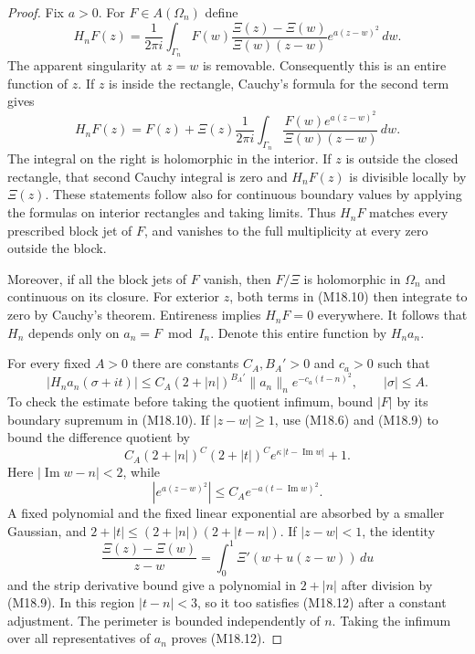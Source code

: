 \documentclass[11pt,a4paper]{article}
\begin{document}
\begin{proof}
Fix \(a>0\).  For \(F\in A(\Omega_n)\) define
\[
 H_nF(z)=\frac1{2\pi i}\int_{\Gamma_n}
    F(w)\frac{\Xi(z)-\Xi(w)}{\Xi(w)(z-w)}
                      e^{a(z-w)^2}\,dw .                       \tag{M18.10}
\]
The apparent singularity at \(z=w\) is removable.
Consequently this is an entire function of \(z\).
If \(z\) is inside the rectangle, Cauchy's formula
for the second term gives
\[
 H_nF(z)=F(z)+\Xi(z)\frac1{2\pi i}
             \int_{\Gamma_n}
               \frac{F(w)e^{a(z-w)^2}}{\Xi(w)(z-w)}\,dw .
                                                                  \tag{M18.11}
\]
The integral on the right is holomorphic in the interior.
If \(z\) is outside the closed rectangle, that second
Cauchy integral is zero and \(H_nF(z)\) is divisible
locally by \(\Xi(z)\).
These statements follow also for continuous boundary
values by applying the formulas on interior rectangles
and taking limits.  Thus \(H_nF\) matches every
prescribed block jet of \(F\), and vanishes to the
full multiplicity at every zero outside the block.

Moreover, if all the block jets of \(F\) vanish, then
\(F/\Xi\) is holomorphic in \(\Omega_n\) and continuous
on its closure.  For exterior \(z\), both terms in
(M18.10) then integrate to zero by Cauchy's theorem.
Entireness implies \(H_nF=0\) everywhere.  It follows
that \(H_n\) depends only on \(a_n=F\bmod I_n\).
Denote this entire function by \(H_n a_n\).

For every fixed \(A>0\) there are constants \(C_A,B_A'>0\)
and \(c_a>0\) such that
\[
 |H_n a_n(\sigma+it)|
       \le C_A(2+|n|)^{B_A'}\|a_n\|_n
                         e^{-c_a(t-n)^2},
                 \qquad |\sigma|\le A.                         \tag{M18.12}
\]
To check the estimate before taking the quotient infimum,
bound \(|F|\) by its boundary supremum in (M18.10).
If \(|z-w|\ge1\), use (M18.6) and (M18.9) to bound
the difference quotient by
\[
 C_A(2+|n|)^C(2+|t|)^C
                    e^{\kappa\,\lvert t-\operatorname{Im}w\rvert}
       +1 .
\]
Here \(|\operatorname{Im}w-n|<2\), while
\[
 |e^{a(z-w)^2}|
       \le C_A e^{-a(t-\operatorname{Im}w)^2}.
\]
A fixed polynomial and the fixed linear exponential
are absorbed by a smaller Gaussian, and
\(2+|t|\le(2+|n|)(2+|t-n|)\).
If \(|z-w|<1\), the identity
\[
 \frac{\Xi(z)-\Xi(w)}{z-w}
      =\int_0^1\Xi'(w+u(z-w))\,du
\]
and the strip derivative bound give a polynomial in
\(2+|n|\) after division by (M18.9).
In this region \(|t-n|<3\), so it too satisfies (M18.12)
after a constant adjustment.  The perimeter is bounded
independently of \(n\).  Taking the infimum over all
representatives of \(a_n\) proves (M18.12).


\end{proof}
\end{document}
